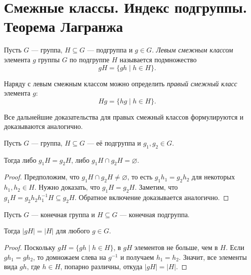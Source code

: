 \section{Смежные классы. Индекс подгруппы. Теорема Лагранжа}

\begin{definition}
    Пусть $G$ --- группа, $H \subseteq G$ --- подгруппа и $g \in G$. \textit{Левым смежным классом} элемента $g$ группы $G$ по подгруппе $H$ называется подмножество
    \begin{equation*}
        gH = \{gh \mid h \in H\}
    .\end{equation*}

    Наряду с левым смежным классом можно определить \textit{правый смежный класс} элемента $g$:
    \begin{equation*}
        Hg = \{hg \mid h \in H\}
    .\end{equation*}
\end{definition}

Все дальнейшие доказательства для правых смежный классов формулируются и доказываются аналогично.

\begin{lemma}
    Пусть $G$ --- группа, $H \subseteq G$ --- её подгруппа и $g_1, g_2 \in G$.

    Тогда либо $g_1 H = g_2 H$, либо $g_1 H \cap g_2 H = \varnothing$.
\end{lemma}

\begin{proof}
    Предположим, что $g_1 H \cap g_2 H \neq \varnothing$, то есть $g_1 h_1 = g_2 h_2$ для некоторых $h_1, h_2 \in H$. Нужно доказать, что $g_1 H = g_2 H$. Заметим, что $g_1 H = g_2 h_2 h_1^{-1} H \subseteq g_2 H$. Обратное включение доказывается аналогично.
\end{proof}

\begin{lemma}
    Пусть $G$ --- конечная группа и $H \subseteq G$ --- конечная подгруппа.

    Тогда $\left|gH\right| = \left|H\right|$ для любого $g \in G$.
\end{lemma}

\begin{proof}
    Поскольку $gH = \{gh \mid h \in H\}$, в $gH$ элементов не больше, чем в $H$.
    Если $g h_1 = gh_2$, то домножаем слева на $g^{-1}$ и получаем $h_1 = h_2$. Значит, все элементы вида $gh$, где $h \in H$, попарно различны, откуда $\left|gH\right| = \left|H\right|$.
\end{proof}

